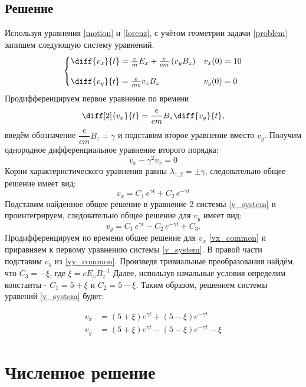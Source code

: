 \documentclass[a4paper]{article}
\begin{document}
\subsection{Решение}
Используя уравнения \eqref{motion} и \eqref{lorenz}, с учётом геометрии задачи \ref{problem} запишем следующую систему уравнений.
\begin{equation}\label{v_system}
\begin{cases}
\diff{v_x}{t} = \frac{e}{m}E_x + \frac{e}{cm}\left(v_yB_z\right)	& 	v_x(0) = 10 \\[10pt]
\diff{v_y}{t} = \frac{e}{mc} v_x B_z					&	v_y(0) = 0 \\
\end{cases}
\end{equation}
Продифференцируем первое уравнение по времени
\[
\diff[2]{v_x}{t} =\frac{e}{cm} B_z \diff{v_y}{t},
\]
введём обозначение $\dfrac{e}{cm}B_z = \gamma$ и подставим второе уравнение вместо $v_y$. Получим однородное дифференциальное уравнение второго порядка:
\[
\ddot{v_x} - \gamma^2 v_x = 0		
\]
Корни характеристического уравнения равны $\lambda_{1,2} = \pm \gamma$, следовательно общее решение имеет вид:
\begin{equation}\label{vx_common}
v_x = C_1\, e^{\gamma t} + C_2\, e^{-\gamma t}
\end{equation}
Подставим найденное общее решение в уравнение 2 системы \eqref{v_system} и проинтегрируем, следовательно общее решение для $v_y$ имеет вид:
\begin{equation}\label{vy_common}
v_y = C_1 \, e^{\gamma t} - C_2 \, e^{-\gamma t} + C_3 .
\end{equation}
Продифференцируем по времени общее решение для $v_x$ \eqref{vx_common} и приравняем к первому уравнению системы \eqref{v_system}. В правой части подставим $v_y$ из \eqref{vy_common}. Произведя тривиальные преобразования найдём, что $C_3 = -\xi$, где $\xi = cE_xB_z^{-1}$ Далее, используя начальные условия определим константы - $C_1 = 5 + \xi$ и $C_2 = 5 - \xi$. Таким образом, решением системы уравений \eqref{v_system} будет:

\begin{align}\label{analytic}
v_x &= (5 + \xi)e^{\gamma t} + (5 - \xi)e^{-\gamma t} \\
v_y &= (5 + \xi)e^{\gamma t} - (5 - \xi)e^{-\gamma t} -\xi 
\end{align}

\section{Численное решение}
\end{document}
